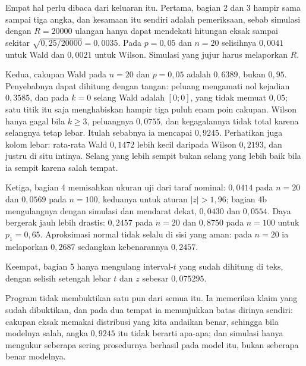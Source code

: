 Empat hal perlu dibaca dari keluaran itu. Pertama, bagian 2 dan 3 hampir sama sampai
tiga angka, dan kesamaan itu sendiri adalah pemeriksaan, sebab simulasi dengan
$R=20000$ ulangan hanya dapat mendekati hitungan eksak sampai sekitar
$\sqrt{0{,}25/20000}=0{,}0035$. Pada $p=0{,}05$ dan $n=20$ selisihnya $0{,}0041$ untuk
Wald dan $0{,}0021$ untuk Wilson. Simulasi yang jujur harus melaporkan $R$.

Kedua, cakupan Wald pada $n=20$ dan $p=0{,}05$ adalah $0{,}6389$, bukan $0{,}95$.
Penyebabnya dapat dihitung dengan tangan: peluang mengamati nol kejadian $0{,}3585$,
dan pada $k=0$ selang Wald adalah $[0;0]$, yang tidak memuat $0{,}05$; satu titik itu
saja menghabiskan hampir tiga puluh enam poin cakupan. Wilson hanya gagal bila
$k\ge3$, peluangnya $0{,}0755$, dan kegagalannya tidak total karena selangnya tetap
lebar. Itulah sebabnya ia mencapai $0{,}9245$. Perhatikan juga kolom lebar: rata-rata
Wald $0{,}1472$ lebih kecil daripada Wilson $0{,}2193$, dan justru di situ intinya.
Selang yang lebih sempit bukan selang yang lebih baik bila ia sempit karena salah
tempat.

Ketiga, bagian 4 memisahkan ukuran uji dari taraf nominal: $0{,}0414$ pada $n=20$ dan
$0{,}0569$ pada $n=100$, keduanya untuk aturan $|z|>1{,}96$; bagian 4b mengulangnya
dengan simulasi dan mendarat dekat, $0{,}0430$ dan $0{,}0554$. Daya bergerak jauh lebih
drastis: $0{,}2457$ pada $n=20$ dan $0{,}8750$ pada $n=100$ untuk $p_1=0{,}65$.
Aproksimasi normal tidak selalu di sisi yang aman: pada $n=20$ ia melaporkan $0{,}2687$
sedangkan kebenarannya $0{,}2457$.

Keempat, bagian 5 hanya mengulang interval-$t$ yang sudah dihitung di teks, dengan
selisih setengah lebar $t$ dan $z$ sebesar $0{,}075295$.

Program tidak membuktikan satu pun dari semua itu. Ia memeriksa klaim yang sudah
dibuktikan, dan pada dua tempat ia menunjukkan batas dirinya sendiri: cakupan eksak
memakai distribusi yang kita andaikan benar, sehingga bila modelnya salah, angka
$0{,}9245$ itu tidak berarti apa-apa; dan simulasi hanya mengukur seberapa sering
prosedurnya berhasil pada model itu, bukan seberapa benar modelnya.

